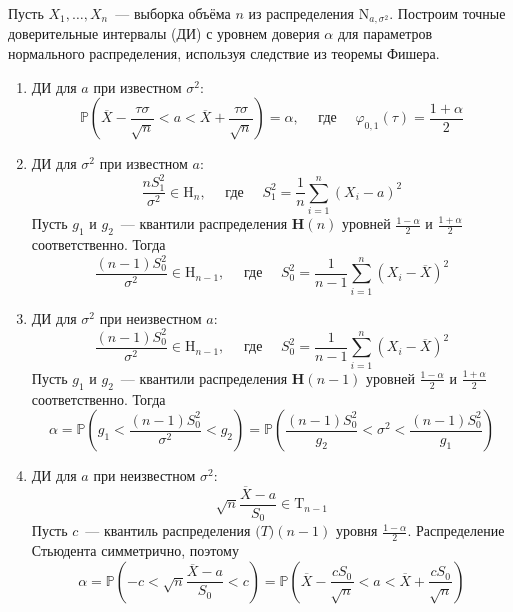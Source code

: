 \documentclass[oneside,final,14pt]{extreport}
\theoremstyle{plain}
\theoremstyle{definition}
\theoremstyle{named}
\begin{document}
Пусть $X_{1}, \ldots, X_{n}$~--- выборка объёма $n$ из распределения $\mathrm{N}_{a, \sigma^{2}}$. Построим точные доверительные интервалы (ДИ) с уровнем доверия $\alpha$ для параметров нормального распределения, используя следствие из теоремы Фишера.
\begin{enumerate}
    \item ДИ для $a$ при известном $\sigma^{2}$:
    \begin{equation*}
        \mathbb{P}\left(\overline{X}-\frac{\tau \sigma}{\sqrt{n}}<a<\overline{X}+\frac{\tau \sigma}{\sqrt{n}}\right)=\alpha, \quad \text { где } \quad \varphi_{0,1}(\tau)=\frac{1 + \alpha}{2}
    \end{equation*}
    \item ДИ для $\sigma^{2}$ при известном $a$:
    \begin{equation*}
        \frac{n S_{1}^{2}}{\sigma^{2}} \in \mathrm{H}_{n}, \quad \text { где } \quad S_{1}^{2}=\frac{1}{n} \sum_{i=1}^{n}\left(X_{i}-a\right)^{2}
    \end{equation*}
    Пусть $g_1$ и $g_2$~--- квантили распределения $\mathbf{H}(n)$ уровней $\frac{1-\alpha}{2}$ и $\frac{1+\alpha}{2}$ соответственно. Тогда
    \begin{equation*}
        \frac{(n-1) S_{0}^{2}}{\sigma^{2}} \in \mathrm{H}_{n-1}, \quad \text { где } \quad S_{0}^{2}=\frac{1}{n-1} \sum_{i=1}^{n}\left(X_{i}-\overline{X}\right)^{2}
    \end{equation*}
    \item ДИ для $\sigma^{2}$ при неизвестном $a$:
    \begin{equation*}
        \frac{(n-1) S_{0}^{2}}{\sigma^{2}} \in \mathrm{H}_{n-1}, \quad \text { где } \quad S_{0}^{2}=\frac{1}{n-1} \sum_{i=1}^{n}\left(X_{i}-\overline{X}\right)^{2}
    \end{equation*}
    Пусть $g_1$ и $g_2$~--- квантили распределения $\mathbf{H}(n-1)$ уровней $\frac{1-\alpha}{2}$ и $\frac{1+\alpha}{2}$ соответственно. Тогда
    \begin{equation*}
        \alpha=\mathbb{P}\left(g_{1}<\frac{(n-1) S_{0}^{2}}{\sigma^{2}}<g_{2}\right)=\mathbb{P}\left(\frac{(n-1) S_{0}^{2}}{g_{2}}<\sigma^{2}<\frac{(n-1) S_{0}^{2}}{g_{1}}\right)
    \end{equation*}
    \item ДИ для $a$ при неизвестном $\sigma^{2}$:
    \begin{equation*}
        \sqrt{n} \frac{\overline{X}-a}{S_{0}} \in \mathrm{T}_{n-1}
    \end{equation*}
    Пусть $c$~--- квантиль распределения $\mathbf(T)(n-1)$ уровня $\frac{1-\alpha}{2}$. Распределение Стьюдента симметрично, поэтому
    \begin{equation*}
        \alpha=\mathbb{P}\left(-c<\sqrt{n} \frac{\overline{X}-a}{S_{0}}<c\right)=\mathbb{P}\left(\overline{X}-\frac{c S_{0}}{\sqrt{n}}<a<\overline{X}+\frac{c S_{0}}{\sqrt{n}}\right)
    \end{equation*}
\end{enumerate}
\end{document}
